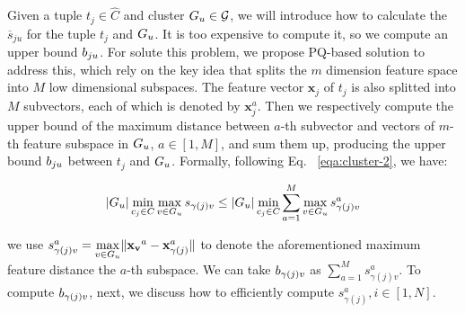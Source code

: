 


Given a tuple $t_j\in \hat{C}$ and cluster $G_u \in \mathcal{G}$, we will introduce how to calculate the $\overline{s}_{ju}$ for the tuple $t_{j}$ and $G_u$. It is too expensive to compute it, so we compute an upper bound $b_{ju}$. For solute this problem, we propose PQ-based solution to address this, which rely on the key idea that splits the $m$ dimension feature space into $M$ low dimensional subspaces. The feature vector $\mathbf{x}_{j}$ of $t_{j}$ is also splitted into $M$ subvectors, each of which is denoted by $\mathbf{x}^a_{j}$. Then we respectively compute the upper bound of the maximum distance between $a$-th subvector and vectors of $m$-th feature subspace in $G_u$, $a\in [1,M]$, and sum them up, producing the upper bound $b_{ju}$ between $t_{j}$ and $G_u$. Formally, following Eq. ~\ref{eqa:cluster-2}, we have:

\begin{equation}\label{eqa:cluster-6}
    \begin{aligned}
        |G_u| \min_{c_j\in C} \max_{v \in G_u} s_{\gamma(j)v} \leq |G_u| \min_{c_j\in C} \sum_{a = 1}^M \max_{v \in G_u} s_{\gamma(j)v}^a
    \end{aligned}
\end{equation}

\noindent we use $s_{\gamma(j)v}^a = \max\limits_{v \in G_u}\lVert \mathbf{x_v}^a - \mathbf{x}^a_{\gamma(j)}\rVert$ to denote the aforementioned maximum feature distance \wrt the $a$-th subspace. We can take $b_{\gamma(j)v}$ as $\sum_{a=1}^{M} s^a_{\gamma(j)v}$. To compute $b_{\gamma(j)v}$, next, we  discuss how to efficiently compute  $s_{\gamma(j)}^a, i\in [1,N]$.

